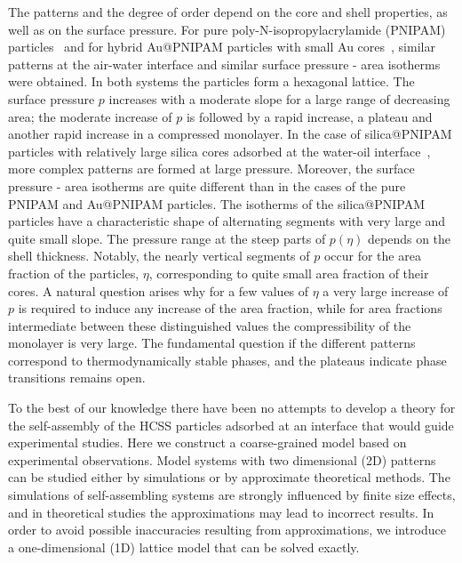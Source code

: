 \documentclass[preprint,
prl,%
aps]{revtex4}
\begin{document}
 The patterns and the degree of order depend on the  core and  shell properties, 
 as well as on the surface pressure.  For pure
poly-N-isopropylacrylamide (PNIPAM) particles~\cite{nakahama:02:0} and for hybrid Au@PNIPAM
 particles with small Au cores~\cite{vogel:12:0},
similar patterns at the air-water interface and similar surface pressure - area isotherms were obtained. 
In both systems the particles form a hexagonal lattice. The surface pressure  $p$ increases with a moderate slope
for a large range of decreasing area; the moderate increase of  $p$ is followed by a  rapid increase, a 
 plateau and another rapid increase in a compressed monolayer. 
 In the case of silica@PNIPAM 
particles with relatively large silica cores 
adsorbed at the water-oil interface~\cite{rauh:16:0}, 
 more complex 
patterns are formed at large pressure. Moreover,
the  surface pressure - area isotherms 
are quite different than in the cases of the pure PNIPAM and Au@PNIPAM particles.
The isotherms of the silica@PNIPAM particles
have a characteristic shape of alternating segments with very large and quite 
small slope. The pressure range at the steep parts of $p(\eta)$ depends on the shell thickness.
Notably, the nearly vertical segments of  $p$ occur
for the area fraction of the particles, $\eta$, corresponding
to quite small area fraction of their cores. A natural question arises why for a few values of  
 $\eta$ a very large increase of $p$ is required  to induce any increase of the area fraction, while for
 area fractions intermediate between these distinguished values the compressibility of the monolayer is very large.  
 The fundamental question if the different patterns correspond to thermodynamically stable phases, and
  the plateaus  indicate phase transitions
 remains open.
 
 To the best of our knowledge there have been no attempts to develop a theory for the self-assembly of the 
 HCSS particles adsorbed at an interface that would  
 guide experimental studies. 
 Here
we construct a  coarse-grained model based on experimental observations.
 Model systems with two dimensional (2D) patterns can be studied either 
by simulations or by approximate theoretical methods. The simulations
of self-assembling systems are strongly influenced by finite size effects, and 
in theoretical studies the approximations may lead to incorrect results. 
In order to avoid possible inaccuracies resulting from approximations, we 
 introduce a one-dimensional (1D) lattice model that can be solved exactly.
\end{document}
